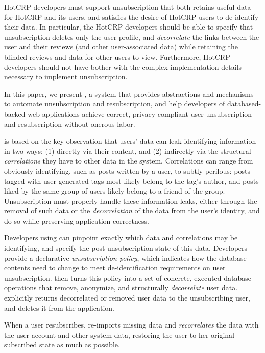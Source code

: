 HotCRP developers must support unsubscription that both retains useful data for HotCRP and its
users, and satisfies the desire of HotCRP users to de-identify their data. In particular, the HotCRP
developers should be able to specify that unsubscription deletes only the user profile, and
\emph{decorrelate} the links between the user and their reviews (and other user-associated data)
while retaining the blinded reviews and data for other users to view.  Furthermore, HotCRP
developers should not have bother with the complex implementation details necessary to implement
unsubscription.

In this paper, we present \sys, a system that provides
abstractions and mechanisms to automate unsubscription and resubscription, and 
help developers of databased-backed web applications achieve correct, privacy-compliant user
unsubscription and resubscription without onerous labor.

\sys is based on the key observation that users' data can leak identifying information in two ways:
(1) directly via their content, and (2) indirectly via the structural \emph{correlations} they have
to other data in the system. Correlations can range from obviously identifying, such as posts
written by a user, to subtly perilous: posts tagged with user-generated tags most likely belong to
the tag's author, and posts liked by the same group of users likely belong to a friend of the group.
Unsubscription must properly handle these information leaks, either through the removal of such data
or the \emph{decorrelation} of the data from the user's identity, and do so while preserving
application correctness.

%
Developers using \sys can pinpoint exactly which data and correlations may be identifying, and
specify the post-unsubscription state of this data. Developers provide a declarative
\emph{unsubscription policy}, which indicates how the database contents need to change to meet
de-identification requirements on user unsubscription.
%
\sys then turns this policy into a set of concrete, executed database operations that remove,
anonymize, and structurally \emph{decorrelate} user data. \sys explicitly returns decorrelated or
removed user data to the unsubscribing user, and deletes it from the application.
%

%
When a user resubscribes, \sys re-imports missing data and \emph{recorrelates} the data with the
user account and other system data, restoring the user to her original subscribed state as much as
possible.

